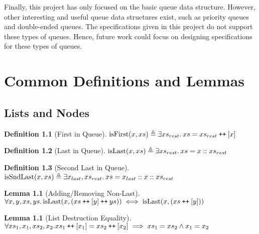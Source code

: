 \documentclass[a4paper, 10pt]{report}
\theoremstyle{definition}
\newtheorem{lemma}[theorem]{Lemma}
\newtheorem{definition}{Definition}[section]
\newcommand{\isFirst}{\operatorname{isFirst}}
\newcommand{\isLast}{\operatorname{isLast}}
\newcommand{\isSndLast}{\operatorname{isSndLast}}
\newcommand\catenate{\mathbin{\text{\ttfamily\upshape ++}}}
\begin{document}
Finally, this project has only focused on the basic queue data structure. However, other interesting and useful queue data structures exist, such as priority queues and double-ended queues. The specifications given in this project do not support these types of queues. Hence, future work could focus on designing specifications for these types of queues.


\cleardoublepage
{}




\cleardoublepage
\appendix
\chapter{Common Definitions and Lemmas}\label{ch:appendix:common}

\section{Lists and Nodes}
\label{appendix:common:section:ListsNodes}

\begin{definition}[First in Queue]\label{COMMON:Def:first-q}
  $\isFirst(x, xs) \eqdef \Exists xs_{rest} . xs = xs_{rest} \catenate [x]$
\end{definition}

\begin{definition}[Last in Queue]\label{COMMON:Def:last-q}
  $\isLast(x, xs) \eqdef \Exists xs_{rest} . xs = x :: xs_{rest}$
\end{definition}

\begin{definition}[Second Last in Queue]\label{COMMON:Def:sndlast-q}
  $\isSndLast(x, xs) \eqdef \Exists x_{last}, xs_{rest} . xs = x_{last} :: x :: xs_{rest}$
\end{definition}

\begin{lemma}[Adding/Removing Non-Last]\label{lemma:isLast-remove}
  $\All x, y, xs, ys.\\
  \isLast(x, (xs \catenate [y] \catenate ys)) \iff \isLast(x, (xs \catenate [y]))$
\end{lemma}

\begin{lemma}[List Destruction Equality]\label{lemma:list-last-eq}
  $\All xs_1, x_1, xs_2, x_2.\\
  xs_1 \catenate [x_1] = xs_2 \catenate [x_2] \implies xs_1 = xs_2 \land{} x_1 = x_2$
\end{lemma}
\end{document}
